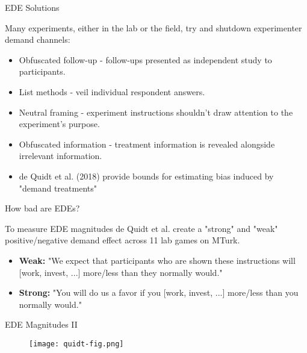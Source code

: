 \documentclass[aspectratio=169,xcolor=dvipsnames]{beamer}
\begin{document}
\begin{frame}{EDE Solutions}


Many experiments, either in the lab or the field, try and shutdown 
    experimenter demand channels:
\begin{itemize}
        \item Obfuscated follow-up - follow-ups presented as independent study to participants.
        \item List methods - veil individual respondent answers.
        \item Neutral framing - experiment instructions shouldn't draw attention to the experiment's purpose.
        \item Obfuscated information - treatment information is revealed alongside irrelevant information.
        \item de Quidt et al. (2018) provide bounds for estimating bias induced by "demand 
    treatments" 
\end{itemize}

\end{frame}



\begin{frame}{How bad are EDEs?}

To measure EDE magnitudes de Quidt et al. create a "strong" and "weak" positive/negative demand effect 
    across 11 lab games on MTurk.

    \begin{itemize}
        \item \textbf{Weak:}  "We expect that participants who are shown these instructions will [work, invest, ...] more/less than they
        normally would."
        \item  \textbf{Strong:}  "You will do us a favor if you [work, invest, ...] more/less than
you normally would."
    \end{itemize}

    

\end{frame}

\begin{frame}[label=magnitudes]{EDE Magnitudes II}

    \begin{figure}[htbp]
        \centering
        \texttt{[image: quidt-fig.png]} 
    \end{figure}
    \hyperlink{res-table}{}
\end{frame}
\end{document}
